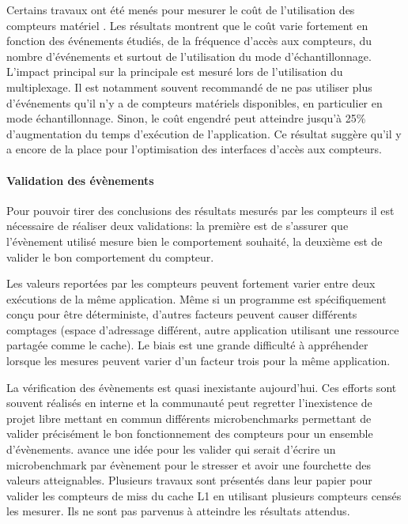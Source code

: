             Certains travaux ont été menés pour mesurer le coût de l'utilisation des compteurs matériel \cite{Bitzes2014}. Les résultats montrent que le coût varie fortement en fonction des événements étudiés, de la fréquence d'accès aux compteurs, du nombre d'événements et surtout de l'utilisation du mode d'échantillonnage. L'impact principal sur la principale est mesuré lors de l'utilisation du multiplexage. Il est notamment souvent recommandé de ne pas utiliser plus d'événements qu'il n'y a de compteurs matériels disponibles, en particulier en mode échantillonnage. Sinon, le coût engendré peut atteindre jusqu'à 25\% d'augmentation du temps d'exécution de l'application. Ce résultat suggère qu'il y a encore de la place pour l'optimisation des interfaces d'accès aux compteurs. 
    
        \paragraph{Validation des évènements}
        
            Pour pouvoir tirer des conclusions des résultats mesurés par les compteurs il est nécessaire de réaliser deux validations: la première est de s'assurer que l'évènement utilisé mesure bien le comportement souhaité, la deuxième est de valider le bon comportement du compteur.
        
            Les valeurs reportées par les compteurs peuvent fortement varier entre deux exécutions de la même application. Même si un programme est spécifiquement conçu pour être déterministe, d'autres facteurs peuvent causer différents comptages (espace d'adressage différent, autre application utilisant une ressource partagée comme le cache). Le biais est une grande difficulté à appréhender lorsque les mesures peuvent varier d'un facteur trois pour la même application.
                
            La vérification des évènements est quasi inexistante aujourd'hui. Ces efforts sont souvent réalisés en interne et la communauté \cite{Moseley2011} peut regretter l'inexistence de projet libre mettant en commun différents microbenchmarks permettant de valider précisément le bon fonctionnement des compteurs pour un ensemble d'évènements. \cite{Moseley2011} avance une idée pour les valider qui serait d'écrire un microbenchmark par évènement pour le stresser et avoir une fourchette des valeurs atteignables. Plusieurs travaux sont présentés dans leur papier pour valider les compteurs de miss du cache L1 en utilisant plusieurs compteurs censés les mesurer. Ils ne sont pas parvenus à atteindre les résultats attendus.
        
